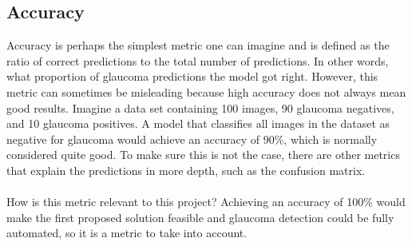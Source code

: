 \documentclass[11pt, a4paper]{article}
\begin{document}
\subsection{Accuracy}
Accuracy is perhaps the simplest metric one can imagine and is defined as the ratio of correct predictions to the total number of predictions. In other words, what proportion of glaucoma predictions the model got right. However, this metric can sometimes be misleading because high accuracy does not always mean good results. Imagine a data set containing 100 images, 90 glaucoma negatives, and 10 glaucoma positives. A model that classifies all images in the dataset as negative for glaucoma would achieve an accuracy of 90\%, which is normally considered quite good. To make sure this is not the case, there are other metrics that explain the predictions in more depth, such as the confusion matrix.
\\
\\
How is this metric relevant to this project? Achieving an accuracy of 100\% would make the first proposed solution feasible and glaucoma detection could be fully automated, so it is a metric to take into account.
\end{document}
